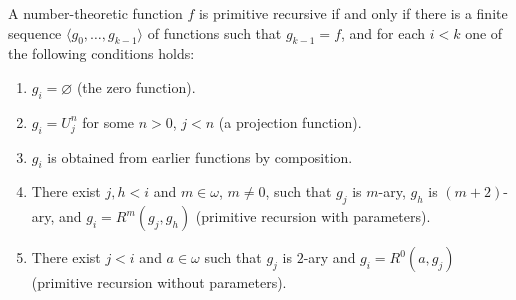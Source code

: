 A number-theoretic function $f$ is primitive recursive if and only if there is a finite sequence $\langle g_0, \ldots, g_{k-1} \rangle$ of functions such that $g_{k-1} = f$, and for each $i < k$ one of the following conditions holds:
\begin{enumerate}
\item[(i)] $g_i = \varnothing$ (the zero function).
\item[(ii)] $g_i = U_j^n$ for some $n > 0$, $j < n$ (a projection function).
\item[(iii)] $g_i$ is obtained from earlier functions by composition.
\item[(iv)] There exist $j, h < i$ and $m \in \omega$, $m \neq 0$, such that $g_j$ is $m$-ary, $g_h$ is $(m+2)$-ary, and $g_i = R^m(g_j, g_h)$ (primitive recursion with parameters).
\item[(v)] There exist $j < i$ and $a \in \omega$ such that $g_j$ is $2$-ary and $g_i = R^0(a, g_j)$ (primitive recursion without parameters).
\end{enumerate}
